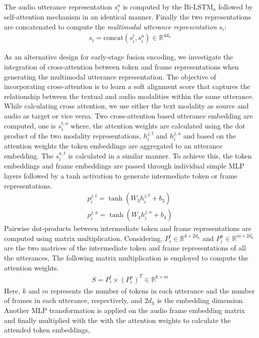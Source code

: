 The audio utterance representation $s_{i}^{a}$ is computed by the $\text{Bi-LSTM}_{a}$ followed by self-attention mechanism in an identical manner. 
Finally the two representations are concatenated to compute the \textit{multimodal utterance representation} $s_{i}$:
%
\begin{align}
s_{i} = \text{concat} ({s_{i}^{t}}, {s_{i}^{a}}) \in \mathbb{R}^{4d_{h}}
\end{align}
%

As an alternative design for early-stage fusion encoding, we investigate the integration of cross-attention between token and frame representations when generating the multimodal utterance representation.
The objective of incorporating cross-attention is to learn a soft alignment score that captures the relationship between the textual and audio modalities within the same utterance. While calculating cross attention, we use either the text modality as source and audio as target or vice versa. Two cross-attention based utterance embedding are computed, one is $s_{i}^{t,a}$ where, the attention weights are calculated using the dot product of the two modality representations, $ h_{i}^{j, t} $ and $ h_{i}^{j, a} $ and based on the attention weights the token embeddings are aggregated to an utterance embedding. The $s_{i}^{a,t}$ is calculated in a similar manner. To achieve this, the token embeddings and frame embeddings are passed through individual simple MLP layers followed by a tanh activation to generate intermediate token or frame representations.
%
\begin{align}
p_{i}^{j, t} = \tanh(W_3 h_{i}^{j, t} + b_3)\\
p_{i}^{j, a} = \tanh(W_4 h_{i}^{j, a} + b_4)
\end{align}
%
Pairwise dot-products between intermediate token and frame representations are computed using matrix multiplication. Considering, $P_{i}^{t} \in \mathbb{R}^{k \times 2d_{h}}$ and  $P_{i}^{a} \in \mathbb{R}^{m \times 2d_{h}} $ are the two matrices of the intermediate token and frame representations of all the utterances, The following matrix multiplication is employed to compute the attention weights.
%
\begin{align}
S = P_{i}^{t} \times (P_{i}^{a})^{T} \in \mathbb{R}^{k \times m}
\end{align}
%
Here, $k$ and $m$ represents the number of tokens in each utterance and the number of frames in each utterance, respectively, and $2d_{h}$ is the embedding dimension. Another MLP transformation is applied on the audio frame embedding matrix and finally multiplied with the with the attention weights to calculate the attended token embeddings,

